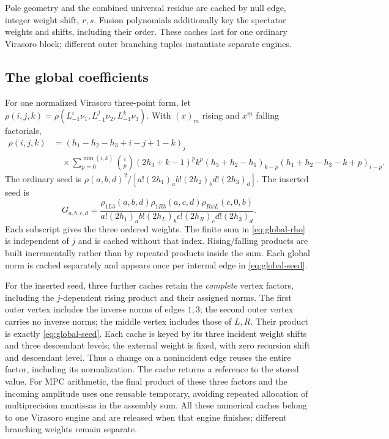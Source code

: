 \documentclass[11pt]{article}
\numberwithin{equation}{section}
\begin{document}
Pole geometry and the combined universal residue are cached by null edge,
integer weight shift, $r,s$. Fusion polynomials additionally key the spectator
weights and shifts, including their order. These caches last for one ordinary
Virasoro block; different outer branching tuples instantiate separate engines.

\subsection{The global coefficients}
For one normalized Virasoro three-point form, let
$\rho(i,j,k)=\rho(L_{-1}^i\nu_1,L_{-1}^j\nu_2,L_{-1}^k\nu_3)$.
With $(x)_m$ rising and $x^{\underline m}$ falling factorials,
\begin{align}
 \rho(i,j,k)&=(h_1-h_2-h_3+i-j+1-k)_j\nonumber\\
 &\quad\times\sum_{p=0}^{\min(i,k)}\binom{i}{p}
 (2h_3+k-1)^{\underline p}k^{\underline p}
 (h_3+h_2-h_1)_{k-p}
 (h_1+h_2-h_3-k+p)_{i-p}.
 \label{eq:global-rho}
\end{align}
The ordinary seed is $\rho(a,b,d)^2/[a!(2h_1)_a b!(2h_2)_b d!(2h_3)_d]$.
The inserted seed is
\begin{equation}
 G_{a,b,c,d}=
 \frac{\rho_{1L3}(a,b,d)\rho_{1R3}(a,c,d)\rho_{R\psi L}(c,0,b)}
 {a!(2h_1)_a b!(2h_L)_b c!(2h_R)_c d!(2h_3)_d}.
 \label{eq:global-seed}
\end{equation}
Each subscript gives the three ordered weights.
The finite sum in \eqref{eq:global-rho} is independent of $j$ and is cached
without that index. Rising/falling products are built incrementally rather
than by repeated products inside the sum. Each global norm is cached separately
and appears once per internal edge in \eqref{eq:global-seed}.

For the inserted seed, three further caches retain the \emph{complete}
vertex factors, including the $j$-dependent rising product and their assigned
norms. The first outer vertex includes the inverse norms of edges $1,3$;
the second outer vertex carries no inverse norms; the middle vertex includes those
of $L,R$. Their product is exactly \eqref{eq:global-seed}. Each cache is
keyed by its three incident weight shifts and three descendant levels;
the external weight is fixed, with zero recursion shift and descendant level.
Thus a change on a nonincident edge
reuses the entire factor, including its normalization. The cache returns
a reference to the stored value. For MPC arithmetic, the final product of
these three factors and the incoming amplitude uses one reusable temporary,
avoiding repeated allocation of multiprecision mantissas in the assembly sum.
All these numerical caches belong to one Virasoro engine and are released
when that engine finishes; different branching weights remain separate.
\end{document}
